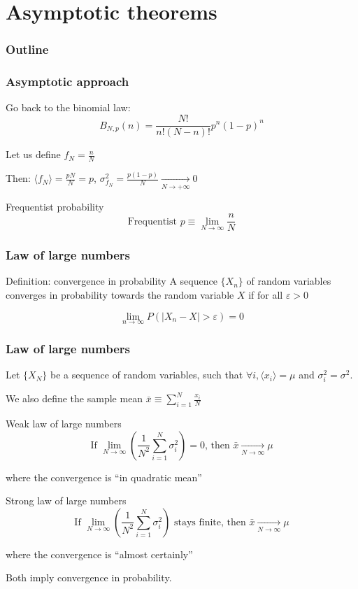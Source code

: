 \documentclass[9pt]{beamer}
\begin{document}
\section{Asymptotic theorems}

\begin{frame}
 \frametitle{Outline}
 
 \tableofcontents[current]
\end{frame}

\begin{frame}
 \frametitle{Asymptotic approach}
 
 Go back to the binomial law: $$B_{N,p}(n) = \frac{N!}{n!(N-n)!} p^n (1-p)^n$$
 
 Let us define $f_N = \frac{n}{N}$
 
 Then: $\langle f_N \rangle = \frac{pN}{N} = p$, $\sigma^2_{f_N} = \frac{p(1-p)}{N} \xrightarrow[N \to +\infty]{} 0$
 
 \begin{block}{Frequentist probability}
  $$\text{Frequentist } p \equiv \lim_{N \to \infty} \frac{n}{N}$$
 \end{block}

\end{frame}

\begin{frame}
 \frametitle{Law of large numbers}
 
 \begin{block}{Definition: convergence in probability}
  A sequence $\{X_n\}$ of random variables converges in probability towards the random variable $X$ if for all $\varepsilon > 0$

    $$ \lim _{n\to \infty }P \left( |X_{n}-X|>\varepsilon \right)=0$$
 \end{block}

\end{frame}

\begin{frame}
 \frametitle{Law of large numbers}
 
 Let $\{X_N\}$ be a sequence of random variables, such that $\forall i, \langle x_i \rangle = \mu$ and $\sigma^2_i = \sigma^2$. 
 
 We also define the sample mean
 $\bar{x} \equiv \sum_{i=1}^N \frac{x_i}{N}$
 
 \begin{block}{Weak law of large numbers}
  $$\text{If } \lim_{N \to \infty} \left( \frac{1}{N^2} \sum_{i=1}^N \sigma^2_i\right) = 0\text{, then } \bar{x} \xrightarrow[N \to \infty]{} \mu$$
  
  where the convergence is ``in quadratic mean''
 \end{block}
 
 \begin{block}{Strong law of large numbers}
  $$\text{If } \lim_{N \to \infty} \left( \frac{1}{N^2} \sum_{i=1}^N \sigma^2_i\right)\text{ stays finite, then } \bar{x} \xrightarrow[N \to \infty]{} \mu$$
  
  where the convergence is ``almost certainly''
 \end{block}
 
 Both imply convergence in probability.

\end{frame}
\end{document}
